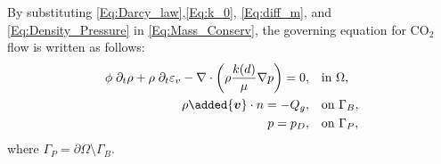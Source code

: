 

By substituting \eqref{Eq:Darcy_law},\eqref{Eq:k_0}, \eqref{Eq:diff_m}, and \eqref{Eq:Density_Pressure} in \eqref{Eq:Mass_Conserv}, the governing equation for CO$_2$ flow is written as follows: 
\begin{equation}\label{Eq:General_pressure}
\begin{aligned}
\phi \; \partial_t \rho+\rho \; \partial_t \varepsilon_v -\nabla \cdot \left( \rho \frac{ k(d)}{\mu} \nabla p \right) =0,  \quad  &\text{in~} \Omega,\\
\rho\added{\bm{v}} \cdot n =-Q_g, \quad &\text{on~} \Gamma_B,\\
p = p_D, \quad &\text{on~}\Gamma_P,
\end{aligned}
\end{equation}
where $\Gamma_P=\partial\Omega\setminus\Gamma_B$. 

